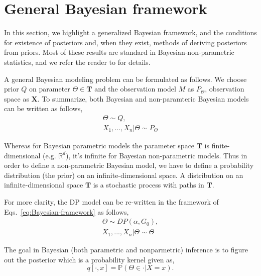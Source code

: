 \documentclass[10pt]{article}
\begin{document}
\newpage
\appendix
\onecolumn

\beginSupplementaryMaterials


\section{General Bayesian framework}\label{sec:Bayesian-framework}

In this section, we highlight a generalized Bayesian framework, and the conditions for existence of posteriors and, when they exist, methods of deriving posteriors from priors. Most of these results are standard in Bayesian-non-parametric statistics, and we refer the reader to \cite{ghosal2017fundamentals, orbanz2009construction} for details.

A general Bayesian modeling problem can be formulated as follows. We choose prior $Q$ on parameter $\Theta \in \mathbf{T}$ and the observation model $M$ as $P_{\Theta}$, observation space as $\mathbf{X}$. To summarize, both Bayesian and non-paramteric Bayesian models can be written as follows, 
\begin{align}\label{eq:Bayesian-framework}
\Theta \sim Q,\\ 
X_{1},. . ., X_{n}|\Theta \sim P_{\Theta}
\end{align}

Whereas for Bayesian parametric models the parameter space $\mathbf{T}$ is finite-dimensional (e.g. $\mathbb{R}^{d}$), it's infinite for Bayesian non-parametric models. Thus in order to define a non-parametric Bayesian model, we have to define a probability distribution (the prior) on an infinite-dimensional space. A distribution on an infinite-dimensional space $\mathbf{T}$ is a stochastic process with paths in $\mathbf{T}$. 

For more clarity, the DP model can be  re-written in the framework of Eqs.~\ref{eq:Bayesian-framework} as follows, 
\begin{align}\label{eq:Bayesian-framew}
\Theta \sim DP(\alpha,G_{0}),\\ 
X_{1},. . ., X_{n}|\Theta \sim \Theta
\end{align}

The goal in Bayesian (both parametric and nonparmetric) inference is to figure out the posterior which is a probability kernel given as,
 \[q[\cdot, x] = \mathbb{P}(\Theta \in \cdot|X=x). \]
\end{document}
